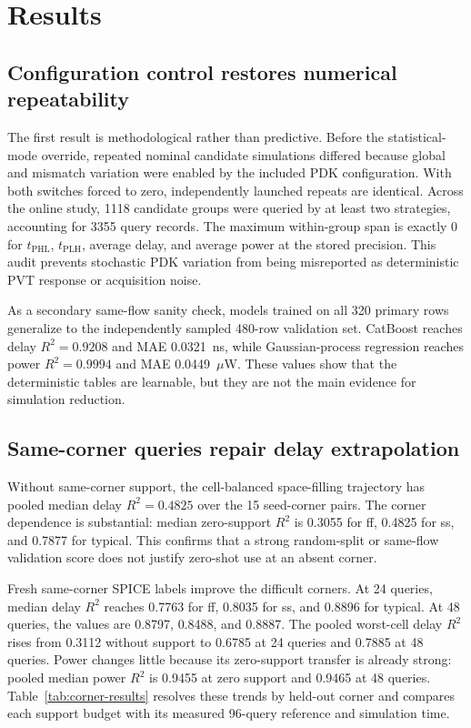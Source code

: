 \documentclass[preprint,12pt]{elsarticle}
\begin{document}
\section{Results}

\subsection{Configuration control restores numerical repeatability}

The first result is methodological rather than predictive. Before the statistical-mode override, repeated nominal candidate simulations differed because global and mismatch variation were enabled by the included PDK configuration. With both switches forced to zero, independently launched repeats are identical. Across the online study, 1118 candidate groups were queried by at least two strategies, accounting for 3355 query records. The maximum within-group span is exactly 0 for $t_{\mathrm{PHL}}$, $t_{\mathrm{PLH}}$, average delay, and average power at the stored precision. This audit prevents stochastic PDK variation from being misreported as deterministic PVT response or acquisition noise.

As a secondary same-flow sanity check, models trained on all 320 primary rows generalize to the independently sampled 480-row validation set. CatBoost reaches delay $R^2=0.9208$ and MAE 0.0321~ns, while Gaussian-process regression reaches power $R^2=0.9994$ and MAE 0.0449~$\mu$W. These values show that the deterministic tables are learnable, but they are not the main evidence for simulation reduction.

\subsection{Same-corner queries repair delay extrapolation}

Without same-corner support, the cell-balanced space-filling trajectory has pooled median delay $R^2=0.4825$ over the 15 seed-corner pairs. The corner dependence is substantial: median zero-support $R^2$ is 0.3055 for ff, 0.4825 for ss, and 0.7877 for typical. This confirms that a strong random-split or same-flow validation score does not justify zero-shot use at an absent corner.

Fresh same-corner SPICE labels improve the difficult corners. At 24 queries, median delay $R^2$ reaches 0.7763 for ff, 0.8035 for ss, and 0.8896 for typical. At 48 queries, the values are 0.8797, 0.8488, and 0.8887. The pooled worst-cell delay $R^2$ rises from 0.3112 without support to 0.6785 at 24 queries and 0.7885 at 48 queries. Power changes little because its zero-support transfer is already strong: pooled median power $R^2$ is 0.9455 at zero support and 0.9465 at 48 queries. Table~\ref{tab:corner-results} resolves these trends by held-out corner and compares each support budget with its measured 96-query reference and simulation time.
\end{document}
